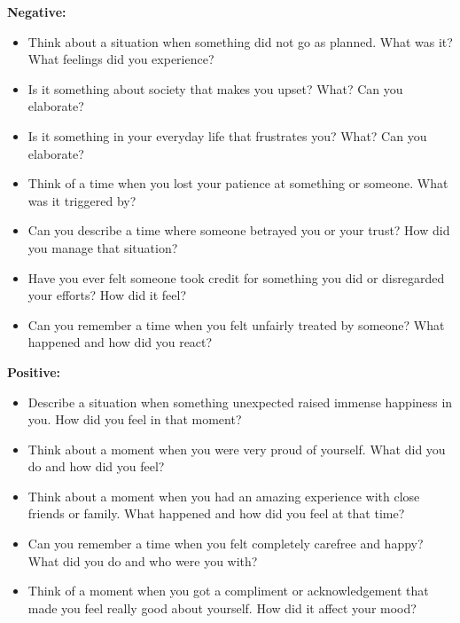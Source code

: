 \begin{table}[H]
    \caption{Interview prompts for positive and negative scenarios}
    \label{list:prompts}
    \begin{minipage}{0.9\textwidth}
      \textbf{Negative:}
      \begin{itemize}
        \item Think about a situation when something did not go as planned. What was it? What feelings did you experience? 
        \item Is it something about society that makes you upset? What? Can you elaborate? 
        \item Is it something in your everyday life that frustrates you? What? Can you elaborate?
        \item Think of a time when you lost your patience at something or someone. What was it triggered by?
        \item Can you describe a time where someone betrayed you or your trust? How did you manage that situation?
        \item Have you ever felt someone took credit for something you did or disregarded your efforts? How did it feel?
        \item Can you remember a time when you felt unfairly treated by someone? What happened and how did you react?
      \end{itemize}
  
      \textbf{Positive:}
      \begin{itemize}
        \item Describe a situation when something unexpected raised immense happiness in you. How did you feel in that moment? 
        \item Think about a moment when you were very proud of yourself. What did you do and how did you feel?
        \item Think about a moment when you had an amazing experience with close friends or family. What happened and how did you feel at that time?
        \item Can you remember a time when you felt completely carefree and happy? What did you do and who were you with?
        \item Think of a moment when you got a compliment or acknowledgement that made you feel really good about yourself. How did it affect your mood?
      \end{itemize}
    \end{minipage}
\end{table}

